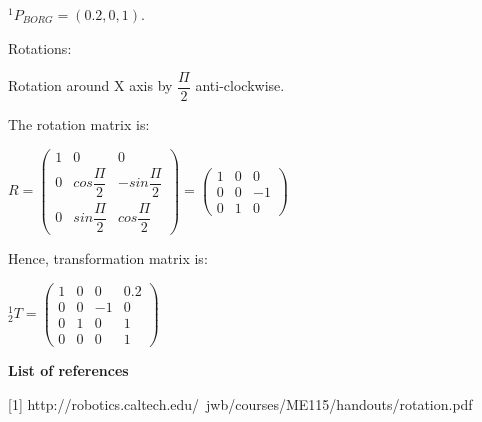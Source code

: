 \documentclass[12pt]{article}
\begin{document}
\begin{list}{)~}{}
$^1 P_{BORG} = \left(0.2, 0, 1\right)$.

Rotations:

\begin{list}{)~}{}
\item Rotation around X axis by $\dfrac{\Pi}{2}$ anti-clockwise.

\end{list}

The rotation matrix is:

$R=
\left(\begin{array}{ccc}
1 & 0 & 0\\
0 & cos \dfrac{\Pi}{2} & -sin \dfrac{\Pi}{2} \\
0 & sin \dfrac{\Pi}{2} & cos \dfrac{\Pi}{2} \end{array}\right)
=
\left(\begin{array}{ccc}
1 & 0 & 0\\
0 & 0 & -1\\
0 & 1 & 0\end{array}\right)$

Hence, transformation matrix is:

$_{2}^{1}T = \left(\begin{array}{cccc}
1 & 0 & 0 & 0.2\\
0 & 0 & -1 & 0\\
0 & 1 & 0 & 1\\
0 & 0 & 0 & 1\end{array}\right)$

\end{list}

\medskip

\textbf{List of references}

[1] http://robotics.caltech.edu/~jwb/courses/ME115/handouts/rotation.pdf
\end{document}
